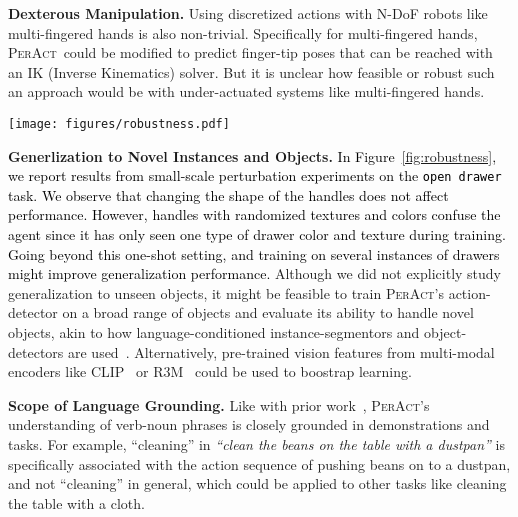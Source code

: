 \documentclass{article}
\newcommand{\figref}[1]{Figure~\ref{#1}}
\newcommand{\highlight}[1]{\textcolor{black}{#1}}
\newcommand{\model}{\textsc{PerAct}}
\begin{document}
\textbf{Dexterous Manipulation.} Using discretized actions with N-DoF robots like multi-fingered hands is also non-trivial. Specifically for multi-fingered hands, \model~could be modified to predict finger-tip poses that can be reached with an IK (Inverse Kinematics) solver. But it is unclear how feasible or robust such an approach would be with under-actuated systems like multi-fingered hands.   


\begin{figure*}[!t]
    \centering
    \vspace{-1.2cm}
    \texttt{[image: figures/robustness.pdf]}
    \caption{\textbf{Perturbation Tests.} Results from a multi-task \model~agent trained on a single drawer and evaluated on several instances perturbed drawers. Each perturbation consists of 25 evaluation episodes, and reported successes are relative to the training drawer.}
    \label{fig:robustness}
    \vspace{-1.5em}
\end{figure*}
\textbf{Generlization to Novel Instances and Objects.} 
\highlight{In \figref{fig:robustness}, we report results from small-scale perturbation experiments on the \texttt{open drawer} task. We observe that changing the shape of the handles does not affect performance. However, handles with randomized textures and colors confuse the agent since it has only seen one type of drawer color and texture during training.
Going beyond this one-shot setting, and training on several instances of drawers might improve generalization performance.}
Although we did not explicitly study generalization to unseen objects, it might be feasible to train \model's action-detector on a broad range of objects and evaluate its ability to handle novel objects, akin to how language-conditioned instance-segmentors and object-detectors are used~\citep{kamath2021mdetr}.
Alternatively, pre-trained vision features from multi-modal encoders like CLIP~\citep{radfordLearningTransferableVisual2021} or R3M~\citep{nair2022r3m} could be used to boostrap learning. 

\textbf{Scope of Language Grounding.} Like with prior work~\citep{cliport}, \model's understanding of verb-noun phrases is closely grounded in demonstrations and tasks. For example, ``cleaning'' in \textit{``clean the beans on the table with a dustpan''} is specifically associated with the action sequence of pushing beans on to a dustpan, and not ``cleaning'' in general, which could be applied to other tasks like cleaning the table with a cloth.
\end{document}
